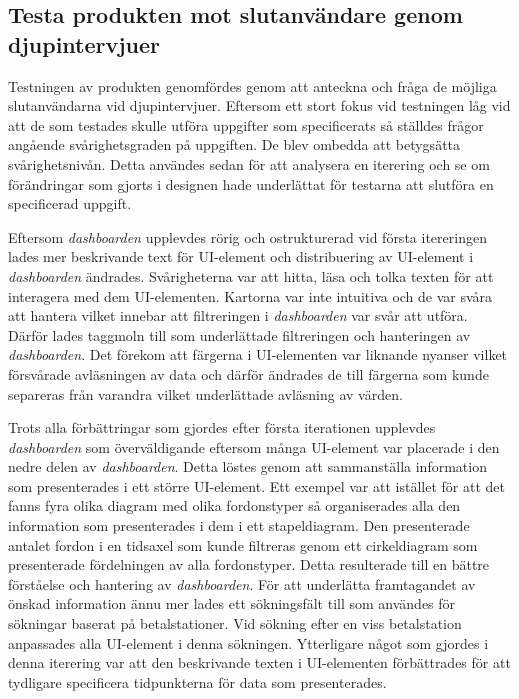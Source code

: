 \documentclass[12pt]{kththesis}
\begin{document}
\subsection{Testa produkten mot slutanvändare genom djupintervjuer } 
Testningen av produkten genomfördes genom att anteckna och fråga de möjliga slutanvändarna vid djupintervjuer. Eftersom ett stort fokus vid testningen låg vid att de som testades skulle utföra uppgifter som specificerats så ställdes frågor angående svårighetsgraden på uppgiften. De blev ombedda att betygsätta svårighetsnivån. Detta användes sedan för att analysera en iterering och se om förändringar som gjorts i designen hade underlättat för testarna att slutföra en specificerad uppgift. 

Eftersom \textit{dashboarden} upplevdes rörig och ostrukturerad vid första itereringen lades mer beskrivande text för UI-element och distribuering av UI-element i \textit{dashboarden} ändrades. Svårigheterna var att hitta, läsa och tolka texten för att interagera med dem UI-elementen. Kartorna var inte intuitiva och de var svåra att hantera vilket innebar att filtreringen i \textit{dashboarden} var svår att utföra. Därför lades taggmoln till som underlättade filtreringen och hanteringen av \textit{dashboarden}. Det förekom att färgerna i UI-elementen var liknande nyanser vilket försvårade avläsningen av data och därför ändrades de till färgerna som kunde separeras från varandra vilket underlättade avläsning av värden.

Trots alla förbättringar som gjordes efter första iterationen upplevdes \textit{dashboarden} som överväldigande eftersom många UI-element var placerade i den nedre delen av \textit{dashboarden}. Detta löstes genom att sammanställa information som presenterades i ett större UI-element. Ett exempel var att istället för att det fanns fyra olika diagram med olika fordonstyper så organiserades alla den information som presenterades i dem i ett stapeldiagram. Den presenterade antalet fordon i en tidsaxel som kunde filtreras genom ett cirkeldiagram som presenterade fördelningen av alla fordonstyper. Detta resulterade till en bättre förståelse och hantering av \textit{dashboarden}. För att underlätta framtagandet av önskad information ännu mer lades ett sökningsfält till som användes för sökningar baserat på betalstationer. Vid sökning efter en viss betalstation anpassades alla UI-element i denna sökningen. Ytterligare något som gjordes i denna iterering var att den beskrivande texten i UI-elementen förbättrades för att tydligare specificera tidpunkterna för data som presenterades. 
\end{document}
